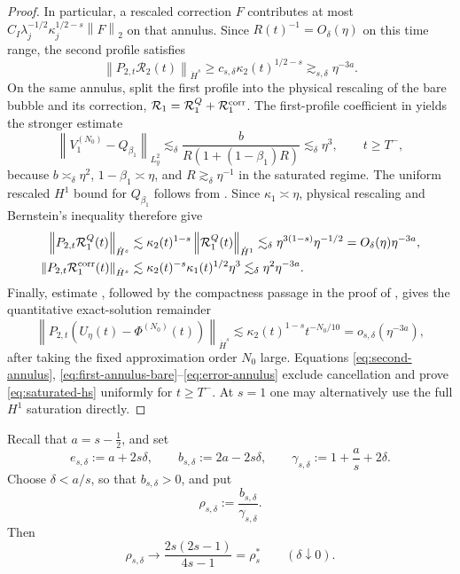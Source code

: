 \documentclass[11pt,reqno]{amsart}
\numberwithin{equation}{section}
\theoremstyle{remark}
\newcommand{\half}{\frac12}
\newcommand{\norm}[1]{\left\lVert #1\right\rVert}
\begin{document}
\begin{proof}
In particular, a rescaled correction $F$ contributes at most
$C_I\lambda_j^{-1/2}\kappa_j^{1/2-s}\norm F_2$ on that annulus.  Since
$R(t)^{-1}=O_\delta(\eta)$ on this time range, the second profile satisfies
\begin{equation}\label{eq:second-annulus}
 \norm{P_{2,t}\mathcal R_2(t)}_{\dot H^s}
 \geq c_{s,\delta}\kappa_2(t)^{1/2-s}
 \gtrsim_{s,\delta}\eta^{-3a}.
\end{equation}
On the same annulus, split the first profile into the physical rescaling of
the bare bubble and its correction,
$\mathcal R_1=\mathcal R_1^Q+\mathcal R_1^{\rm corr}$.  The first-profile
coefficient in \cite[Proposition~4.6]{GLPR} yields the stronger estimate
\[
 \norm{V_1^{(N_0)}-Q_{\beta_1}}_{L_y^2}
 \lesssim_\delta
 \frac{b}{R(1+(1-\beta_1)R)}
 \lesssim_\delta\eta^3,
 \qquad t\geq T^-,
\]
because $b\asymp_\delta\eta^2$, $1-\beta_1\asymp\eta$, and
$R\gtrsim_\delta\eta^{-1}$ in the saturated regime.  The uniform rescaled
$H^1$ bound for $Q_{\beta_1}$ follows from
\cite[Proposition~2.3]{GLPR}.  Since $\kappa_1\asymp\eta$, physical rescaling
and Bernstein's inequality therefore give
\begin{align}
 \norm{P_{2,t}\mathcal R_1^Q(t)}_{\dot H^s}
 &\lesssim \kappa_2(t)^{1-s}
 \norm{\mathcal R_1^Q(t)}_{\dot H^1}
 \lesssim_\delta\eta^{3(1-s)}\eta^{-1/2}
 =O_\delta(\eta)\eta^{-3a},\label{eq:first-annulus-bare}\\
 \norm{P_{2,t}\mathcal R_1^{\rm corr}(t)}_{\dot H^s}
 &\lesssim \kappa_2(t)^{-s}\kappa_1(t)^{1/2}\eta^3
 \lesssim_\delta\eta^2\eta^{-3a}.
 \label{eq:first-annulus-correction}
\end{align}
Finally, estimate \cite[(5.82)]{GLPR}, followed by the compactness passage in
the proof of \cite[Theorem~1.2]{GLPR}, gives the quantitative exact-solution
remainder
\begin{equation}\label{eq:error-annulus}
 \norm{P_{2,t}(U_\eta(t)-\Phi^{(N_0)}(t))}_{\dot H^s}
 \lesssim \kappa_2(t)^{1-s}t^{-N_0/10}
 =o_{s,\delta}(\eta^{-3a}),
\end{equation}
after taking the fixed approximation order $N_0$ large.  Equations
\eqref{eq:second-annulus},
\eqref{eq:first-annulus-bare}--\eqref{eq:error-annulus} exclude cancellation and
prove \eqref{eq:saturated-hs} uniformly for $t\geq T^-$.  At $s=1$ one may
alternatively use the full $H^1$ saturation directly.
\end{proof}

Recall that $a=s-\half$, and set
\begin{equation}\label{eq:abc}
 e_{s,\delta}:=a+2s\delta,
 \qquad
 b_{s,\delta}:=2a-2s\delta,
 \qquad
 \gamma_{s,\delta}:=1+\frac as+2\delta.
\end{equation}
Choose $\delta<a/s$, so that $b_{s,\delta}>0$, and put
\begin{equation}\label{eq:rho-delta}
 \rho_{s,\delta}:=\frac{b_{s,\delta}}{\gamma_{s,\delta}}.
\end{equation}
Then
\begin{equation}\label{eq:rho-limit}
 \rho_{s,\delta}\longrightarrow
 \frac{2s(2s-1)}{4s-1}=\rho_s^*
 \qquad (\delta\downarrow0).
\end{equation}
\end{document}
